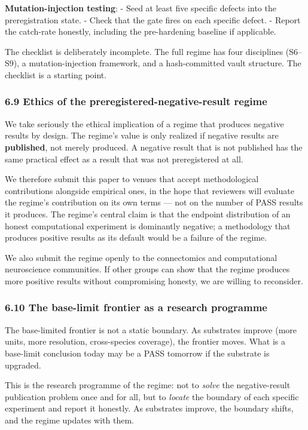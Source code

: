\documentclass[
]{article}
\begin{document}
\textbf{Mutation-injection testing}: - Seed at least five specific
defects into the preregistration state. - Check that the gate fires on
each specific defect. - Report the catch-rate honestly, including the
pre-hardening baseline if applicable.

The checklist is deliberately incomplete. The full regime has four
disciplines (S6--S9), a mutation-injection framework, and a
hash-committed vault structure. The checklist is a starting point.

\subsubsection{6.9 Ethics of the preregistered-negative-result
regime}\label{ethics-of-the-preregistered-negative-result-regime}

We take seriously the ethical implication of a regime that produces
negative results by design. The regime's value is only realized if
negative results are \textbf{published}, not merely produced. A negative
result that is not published has the same practical effect as a result
that was not preregistered at all.

We therefore submit this paper to venues that accept methodological
contributions alongside empirical ones, in the hope that reviewers will
evaluate the regime's contribution on its own terms --- not on the
number of PASS results it produces. The regime's central claim is that
the endpoint distribution of an honest computational experiment is
dominantly negative; a methodology that produces positive results as its
default would be a failure of the regime.

We also submit the regime openly to the connectomics and computational
neuroscience communities. If other groups can show that the regime
produces more positive results without compromising honesty, we are
willing to reconsider.

\subsubsection{6.10 The base-limit frontier as a research
programme}\label{the-base-limit-frontier-as-a-research-programme}

The base-limited frontier is not a static boundary. As substrates
improve (more units, more resolution, cross-species coverage), the
frontier moves. What is a base-limit conclusion today may be a PASS
tomorrow if the substrate is upgraded.

This is the research programme of the regime: not to \emph{solve} the
negative-result publication problem once and for all, but to
\emph{locate} the boundary of each specific experiment and report it
honestly. As substrates improve, the boundary shifts, and the regime
updates with them.
\end{document}
